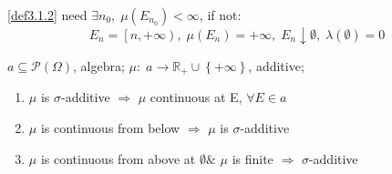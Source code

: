 \begin{remark}
	\ref{def3.1.2} need $\exists {n_0},\;\mu \left( {{E_{{n_0}}}} \right) < \infty $, if not: \
	\begin{equation}
	{E_n} = \left[ {n, + \infty } \right),\;\mu \left( {{E_n}} \right) =  + \infty ,\;{E_n} \downarrow \emptyset ,\;\lambda \left( \emptyset  \right) = 0
	\label{eq3.3}
	\end{equation}
	\label{rmk3.2}
\end{remark}

\begin{lemma}
	$ a \subseteq \mathcal{P}\left(\Omega\right) $, algebra; $\mu :\;a \to {\mathbb{R}_ + } \cup \left\{ { + \infty } \right\}$, additive;
	\begin{enumerate}
		\item \label{lem3.1.1} $ \mu $ is $ \sigma $-additive $ \Rightarrow $ $ \mu  $ continuous at E, $ \forall E \in a $
		\item \label{lem3.1.2} $ \mu $ is continuous from below $ \Rightarrow $ $ \mu  $  is $ \sigma $-additive 
		\item \label{lem3.1.3} $ \mu $ is continuous from above at $ \emptyset \&  $ $ \mu $ is finite $ \Rightarrow $ $ \sigma $-additive 
	\end{enumerate}
\label{lem3.1}
\end{lemma}

